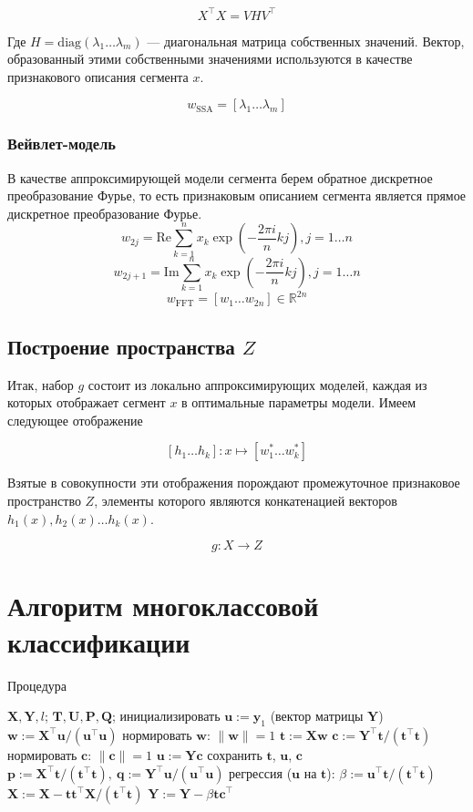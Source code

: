 \documentclass[12pt,fleqn,unicode]{article}
\newcommand{\by}{\mathbf{y}}
\newcommand{\bw}{\mathbf{w}}
\newcommand{\bY}{\mathbf{Y}}
\newcommand{\bX}{\mathbf{X}}
\newcommand{\bu}{\mathbf{u}}
\newcommand{\bt}{\mathbf{t}}
\newcommand{\bp}{\mathbf{p}}
\newcommand{\bq}{\mathbf{q}}
\newcommand{\bc}{\mathbf{c}}
\newcommand{\bP}{\mathbf{P}}
\newcommand{\bT}{\mathbf{T}}
\newcommand{\bQ}{\mathbf{Q}}
\newcommand{\bU}{\mathbf{U}}
\newcommand{\T}{^{\text{\tiny\sffamily\upshape\mdseries T}}}
\newcommand{\R}{\mathbb{R}}
\renewcommand{\T}{\intercal}
\newcommand{\brs}[1]{\left(#1\right)}
\newcommand{\sbrs}[1]{\left[#1\right]}
\begin{document}
$$
X^\intercal X = VHV^\intercal
$$

Где $H = \mathrm{diag}(\lambda_1\ldots \lambda_m)$ --- диагональная матрица собственных значений.
Вектор, образованный этими собственными значениями используются в качестве
признакового описания сегмента $x$.

$$
w_{\text{SSA}} = [\lambda_1 \ldots \lambda_m]
$$

\subsubsection{Вейвлет-модель}

В качестве аппроксимирующей модели сегмента берем обратное дискретное
преобразование Фурье,
то есть признаковым описанием сегмента является прямое дискретное преобразование
Фурье.
$$
    w_{2j} = \mathrm{Re} \sum_{k=1}^{n} x_k \exp\brs{-\frac{2\pi i}{n}kj}, j=1\ldots n
$$
$$
    w_{2j + 1} = \mathrm{Im} \sum_{k=1}^{n} x_k \exp\brs{-\frac{2\pi i}{n}kj}, j=1\ldots n
$$
$$
w_{\text{FFT}} = \sbrs{w_1\ldots w_{2n}}\in \R^{2n}
$$

\subsection{Построение пространства $Z$}


Итак, набор $g$ состоит из локально аппроксимирующих моделей, каждая из которых
отображает сегмент $x$ в оптимальные параметры модели. Имеем следующее отображение

$$
[h_1\ldots h_k]: x \mapsto [w_1^* \ldots w_k^*]
$$

Взятые в совокупности эти отображения порождают промежуточное признаковое пространство
$Z$, элементы которого являются конкатенацией векторов $h_1(x), h_2(x)\ldots h_k(x)$.

$$
g: X \to Z
$$

\section{Алгоритм многоклассовой классификации}


\begin{center}
\begin{algorithm}[h]
\caption{Процедура }
    \label{PLSR_pseudo}
\begin{algorithmic}[1]
\REQUIRE $\bX, \bY, l$;
\ENSURE $\bT, \bU, \bP, \bQ$;
\STATE инициализировать $\bu := \by_1$ (вектор матрицы $\bY$)
  \REPEAT
    \STATE $\bw := \bX^{\T} \bu / (\bu^{\T} \bu)$
    \STATE нормировать $\bw$: $\| \bw \| = 1$
    \STATE $\mathbf{t} := \bX \bw$
    \STATE $\bc := \bY^{\T} \bt / (\bt^{\T} \bt)$
    \STATE нормировать $\bc$:  $\| \bc \| = 1$
    \STATE $\bu := \bY \bc$
  \UNTIL{$\bt$ не перестанет меняться}
  \STATE сохранить $\bt$, $\bu$, $\bc$
  \STATE $\bp := \bX^{\T}\bt/(\bt^{\T}\bt),\ \bq := \bY^{\T}\bu/(\bu^{\T}\bu)$
  \STATE регрессия ($\bu$ на $\bt$): $\beta := \bu^{\T} \bt / (\bt^{\T} \bt)$
  \STATE $\bX := \bX - \bt\bt^{\T}\bX/(\bt^{\T}\bt)$
  \STATE $\bY := \bY - \beta\bt\bc^{\T}$
\ENDFOR
\end{algorithmic}
\end{algorithm}
\end{center}
\end{document}
